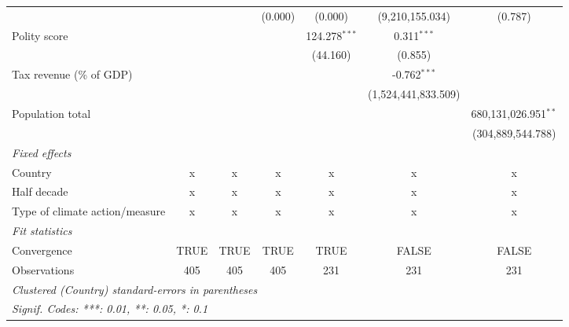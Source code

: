 \begin{tabular}{lcccccc}
                                                                                        &         &                & (0.000)        & (0.000)         & (9,210,155.034)        & (0.787)\\   
   Polity score                                                                         &         &                &                & 124.278$^{***}$ & 0.311$^{***}$          &   \\   
                                                                                        &         &                &                & (44.160)        & (0.855)                &   \\   
   Tax revenue (\% of GDP)                                                              &         &                &                &                 & -0.762$^{***}$         &   \\   
                                                                                        &         &                &                &                 & (1,524,441,833.509)    &   \\   
   Population total                                                                     &         &                &                &                 &                        & 680,131,026.951$^{**}$\\   
                                                                                        &         &                &                &                 &                        & (304,889,544.788)\\   
   \emph{Fixed effects}\\
   Country                                                                              & x       & x              & x              & x               & x                      & x\\  
   Half decade                                                                          & x       & x              & x              & x               & x                      & x\\  
   Type of climate action/measure                                                       & x       & x              & x              & x               & x                      & x\\  
   \midrule \emph{Fit statistics}\\
   Convergence                                                                          &TRUE     & TRUE           & TRUE           & TRUE            & FALSE                  & FALSE\\  
   Observations                                                                         & 405     & 405            & 405            & 231             & 231                    & 231\\  
   \midrule
   \multicolumn{7}{l}{\emph{Clustered (Country) standard-errors in parentheses}}\\
   \multicolumn{7}{l}{\emph{Signif. Codes: ***: 0.01, **: 0.05, *: 0.1}}\\
\end{tabular}
\par\endgroup


